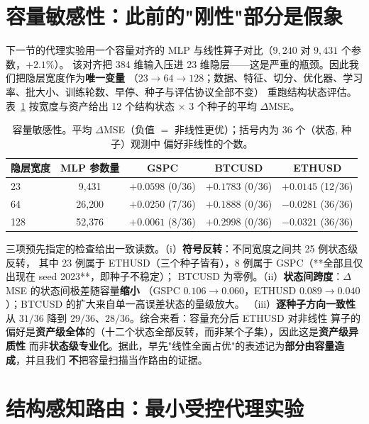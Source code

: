 \documentclass[preprint,12pt]{elsarticle}
\begin{document}
\section{容量敏感性：此前的"刚性"部分是假象}
\label{sec:capacity}

下一节的代理实验用一个容量对齐的 MLP 与线性算子对比（$9{,}240$ 对 $9{,}431$ 个参数，$+2.1\%$）。
该对齐把 384 维输入压进 23 维隐层——这是严重的瓶颈。因此我们把隐层宽度作为\textbf{唯一变量}
（$23 \to 64 \to 128$；数据、特征、切分、优化器、学习率、批大小、训练轮数、早停、种子与评估协议全部不变）
重跑结构状态评估。表~\ref{tab:cap} 按宽度与资产给出 12 个结构状态 $\times$ 3 个种子的平均 $\Delta$MSE。

\begin{table}[!t]
\centering
\small
\caption{容量敏感性。平均 $\Delta$MSE（负值 $=$ 非线性更优）；括号内为 36 个（状态, 种子）观测中
偏好非线性的个数。}
\label{tab:cap}
\begin{tabular}{@{}lcccc@{}}
\toprule
隐层宽度 & MLP 参数量 & GSPC & BTCUSD & ETHUSD \\
\midrule
23  & 9{,}431  & $+0.0598$ (0/36)  & $+0.1783$ (0/36)  & $+0.0145$ (12/36) \\
64  & 26{,}200 & $+0.0250$ (7/36)  & $+0.1888$ (0/36)  & $\mathbf{-0.0281}$ (36/36) \\
128 & 52{,}376 & $+0.0061$ (8/36)  & $+0.2998$ (0/36)  & $\mathbf{-0.0321}$ (36/36) \\
\bottomrule
\end{tabular}
\end{table}

三项预先指定的检查给出一致读数。（i）\textbf{符号反转}：不同宽度之间共 25 例状态级反转，
其中 23 例属于 ETHUSD（三个种子皆有），8 例属于 GSPC（**全部且仅出现在 seed 2023**，即种子不稳定）；
BTCUSD 为零例。（ii）\textbf{状态间跨度}：$\Delta$MSE 的状态间极差随容量\textbf{缩小}
（GSPC $0.106 \to 0.060$，ETHUSD $0.089 \to 0.040$）；BTCUSD 的扩大来自单一高误差状态的量级放大。
（iii）\textbf{逐种子方向一致性}从 $31/36$ 降到 $29/36$、$28/36$。综合来看：容量充分后 ETHUSD 对非线性
算子的偏好是\textbf{资产级全体}的（十二个状态全部反转，而非某个子集），因此这是\textbf{资产级异质性}
而非\textbf{状态级专业化}。据此，早先"线性全面占优"的表述记为\textbf{部分由容量造成}，并且我们
\textbf{不}把容量扫描当作路由的证据。

\section{结构感知路由：最小受控代理实验}
\label{sec:routing}
\end{document}
